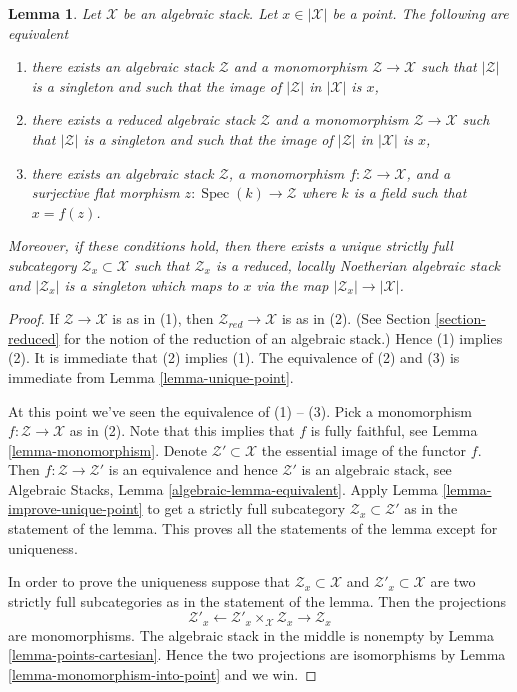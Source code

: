 \documentclass[10pt,a4paper]{amsart}
\theoremstyle{plain}
\newtheorem{lemma}[subsection]{Lemma}
\theoremstyle{definition}
\theoremstyle{remark}
\numberwithin{equation}{subsection}
\def\Spec{\mathop{\mathrm{Spec}}}
\begin{document}
\begin{lemma}
\label{lemma-residual-gerbe}
Let $\mathcal{X}$ be an algebraic stack. Let $x \in |\mathcal{X}|$ be a point.
The following are equivalent
\begin{enumerate}
\item there exists an algebraic stack $\mathcal{Z}$ and a monomorphism
$\mathcal{Z} \to \mathcal{X}$ such that $|\mathcal{Z}|$ is a singleton
and such that the image of $|\mathcal{Z}|$ in $|\mathcal{X}|$ is $x$,
\item there exists a reduced algebraic stack $\mathcal{Z}$ and a monomorphism
$\mathcal{Z} \to \mathcal{X}$ such that $|\mathcal{Z}|$ is a singleton
and such that the image of $|\mathcal{Z}|$ in $|\mathcal{X}|$ is $x$,
\item there exists an algebraic stack $\mathcal{Z}$, a monomorphism
$f : \mathcal{Z} \to \mathcal{X}$, and a surjective flat morphism
$z : \Spec(k) \to \mathcal{Z}$ where $k$ is a field such that
$x = f(z)$.
\end{enumerate}
Moreover, if these conditions hold, then there exists a unique
strictly full subcategory $\mathcal{Z}_x \subset \mathcal{X}$
such that $\mathcal{Z}_x$ is a reduced, locally Noetherian algebraic
stack and $|\mathcal{Z}_x|$ is a singleton which maps to $x$
via the map $|\mathcal{Z}_x| \to |\mathcal{X}|$.
\end{lemma}

\begin{proof}
If $\mathcal{Z} \to \mathcal{X}$ is as in (1), then
$\mathcal{Z}_{red} \to \mathcal{X}$ is as in (2). (See
Section \ref{section-reduced}
for the notion of the reduction of an algebraic stack.)
Hence (1) implies (2).
It is immediate that (2) implies (1).
The equivalence of (2) and (3) is immediate from
Lemma \ref{lemma-unique-point}.

\medskip\noindent
At this point we've seen the equivalence of (1) -- (3).
Pick a monomorphism $f : \mathcal{Z} \to \mathcal{X}$ as in (2).
Note that this implies that $f$ is fully faithful, see
Lemma \ref{lemma-monomorphism}.
Denote $\mathcal{Z}' \subset \mathcal{X}$ the essential image of the functor
$f$. Then $f : \mathcal{Z} \to \mathcal{Z}'$ is an equivalence and hence
$\mathcal{Z}'$ is an algebraic stack, see
Algebraic Stacks, Lemma \ref{algebraic-lemma-equivalent}.
Apply
Lemma \ref{lemma-improve-unique-point}
to get a strictly full subcategory $\mathcal{Z}_x \subset \mathcal{Z}'$
as in the statement of the lemma.
This proves all the statements of the lemma except for uniqueness.

\medskip\noindent
In order to prove the uniqueness suppose that
$\mathcal{Z}_x \subset \mathcal{X}$
and
$\mathcal{Z}'_x \subset \mathcal{X}$
are two strictly full subcategories as in the statement of the lemma.
Then the projections
$$
\mathcal{Z}'_x
\longleftarrow
\mathcal{Z}'_x \times_\mathcal{X} \mathcal{Z}_x
\longrightarrow
\mathcal{Z}_x
$$
are monomorphisms. The algebraic stack in the middle is nonempty by
Lemma \ref{lemma-points-cartesian}.
Hence the two projections are isomorphisms by
Lemma \ref{lemma-monomorphism-into-point}
and we win.
\end{proof}
\end{document}
